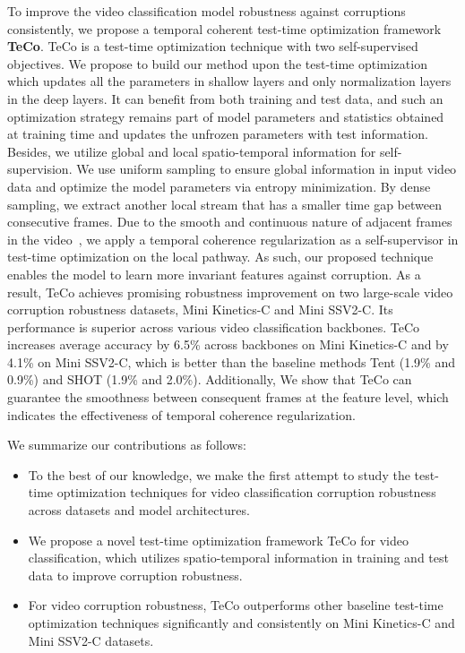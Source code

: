\documentclass{article} %
\begin{document}
To improve the video classification model robustness against corruptions consistently, we propose a temporal coherent test-time optimization framework \textbf{TeCo}.
TeCo is a test-time optimization technique with two self-supervised objectives. 
We propose to build our method upon the test-time optimization which updates all the parameters in shallow layers and only normalization layers in the deep layers.
It can benefit from both training and test data, and such an optimization strategy remains part of model parameters and statistics obtained at training time and updates the unfrozen parameters with test information. 
Besides, we utilize global and local spatio-temporal information for self-supervision. 
We use uniform sampling to ensure global information in input video data and optimize the model parameters via entropy minimization. 
By dense sampling, we extract another local stream that has a smaller time gap between consecutive frames. 
Due to the smooth and continuous nature of adjacent frames in the video~\citep{li2008unsupervised,wood2016development}, we apply a temporal coherence regularization as a self-supervisor in test-time optimization on the local pathway. 
As such, our proposed technique enables the model to learn more invariant features against corruption.
As a result, TeCo achieves promising robustness improvement on two large-scale video corruption robustness datasets, Mini Kinetics-C and Mini SSV2-C.
Its performance is superior across various video classification backbones. 
TeCo increases average accuracy by 6.5\% across backbones on Mini Kinetics-C and by 4.1\% on Mini SSV2-C, which is better than the baseline methods Tent (1.9\% and 0.9\%) and SHOT (1.9\% and 2.0\%). 
Additionally, We show that TeCo can guarantee the smoothness between consequent frames at the feature level, which indicates the effectiveness of temporal coherence regularization.

We summarize our contributions as follows:
\begin{itemize}
    \item To the best of our knowledge, we make the first attempt to study the test-time optimization techniques for video classification corruption robustness across datasets and model architectures.
    \item We propose a novel test-time optimization framework TeCo for video classification, which utilizes spatio-temporal information in training and test data to improve corruption robustness.
    \item For video corruption robustness, TeCo outperforms other baseline test-time optimization techniques significantly and consistently on Mini Kinetics-C and Mini SSV2-C datasets. 
\end{itemize}
\end{document}

